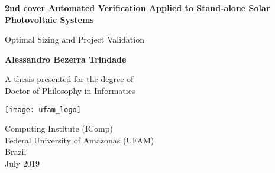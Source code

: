 \begin{titlepage}
    \begin{center}
        \vspace*{1cm}
        
        \Huge
        \textbf{2nd cover Automated Verification Applied to Stand-alone Solar Photovoltaic Systems}
        
        \vspace{0.5cm}
        \LARGE
        Optimal Sizing and Project Validation
        
        \vspace{1.5cm}
        
        \textbf{Alessandro Bezerra Trindade}
        
        \vfill
        
        A thesis presented for the degree of\\
        Doctor of Philosophy in Informatics
        
        \vspace{0.8cm}
        
        \texttt{[image: ufam\_logo]}
        
        \Large
        Computing Institute (IComp)\\
        Federal University of Amazonas (UFAM)\\
        Brazil\\
        July 2019
        
    \end{center}
\end{titlepage}